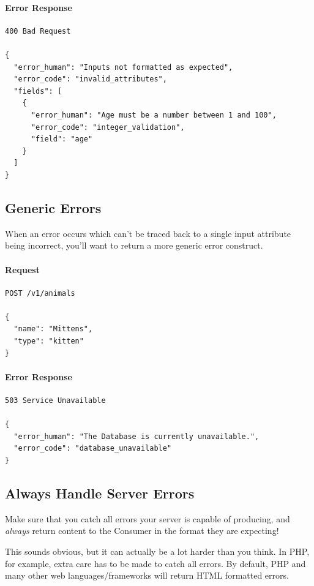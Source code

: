 \documentclass{book}
\begin{document}
\paragraph{\textbf{Error Response}}

\begin{verbatim}
400 Bad Request

{
  "error_human": "Inputs not formatted as expected",
  "error_code": "invalid_attributes",
  "fields": [
    {
      "error_human": "Age must be a number between 1 and 100",
      "error_code": "integer_validation",
      "field": "age"
    }
  ]
}
\end{verbatim}

\subsection{Generic Errors}

When an error occurs which can't be traced back to a single input attribute being incorrect, you'll want to return a more generic error construct.

\paragraph{\textbf{Request}}

\begin{verbatim}
POST /v1/animals

{
  "name": "Mittens",
  "type": "kitten"
}
\end{verbatim}

\paragraph{\textbf{Error Response}}

\begin{verbatim}
503 Service Unavailable

{
  "error_human": "The Database is currently unavailable.",
  "error_code": "database_unavailable"
}
\end{verbatim}

\subsection{Always Handle Server Errors}

Make sure that you catch all errors your server is capable of producing, and \emph{always} return content to the Consumer in the format they are expecting!

This sounds obvious, but it can actually be a lot harder than you think. In PHP, for example, extra care has to be made to catch all errors. By default, PHP and many other web languages/frameworks will return HTML formatted errors.
\end{document}
